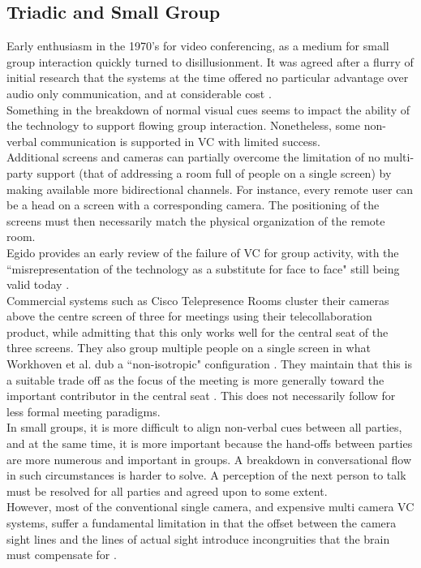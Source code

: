         \subsection{Triadic and Small Group}
Early enthusiasm in the 1970's for video conferencing, as a medium for small group interaction quickly turned to disillusionment. It was agreed after a flurry of initial research that the systems at the time offered no particular advantage over audio only communication, and at considerable cost \cite{Williams1977}.\\
Something in the breakdown of normal visual cues seems to impact the ability of the technology to support flowing group interaction. Nonetheless, some non-verbal communication is supported in VC with limited success. \\
Additional screens and cameras can partially overcome the limitation of no multi-party support (that of addressing a room full of people on a single screen) by making available more bidirectional channels. For instance, every remote user can be a head on a screen with a corresponding camera. The positioning of the screens must then necessarily match the physical organization of the remote room.\\
Egido provides an early review of the failure of VC for group activity, with the ``misrepresentation of the technology as a substitute for face to face" still being valid today \cite{Edigo1988}.\\
Commercial systems such as Cisco Telepresence Rooms cluster their cameras above the centre screen of three for meetings using their telecollaboration product, while admitting that this only works well for the central seat of the three screens. They also group multiple people on a single screen in what Workhoven et al. dub a ``non-isotropic" configuration \cite{Pejsa2016}. They maintain that this is a suitable trade off as the focus of the meeting is more generally toward the important contributor in the central seat \cite{CiscoSystems}. This does not necessarily follow for less formal meeting paradigms.\\
            In small groups, it is more difficult to align non-verbal cues between all  parties, and at the same time, it is more important because the hand-offs between parties are more numerous and important in groups. A breakdown in conversational flow in such circumstances is harder to solve. A perception of the next person to talk must be resolved for all parties and agreed upon to some extent.\\
                However, most of the conventional single camera, and expensive multi camera VC systems, suffer a fundamental limitation in that the offset between the camera sight lines and the lines of actual sight introduce incongruities that the brain must compensate for \cite{Wolff2008}.\\
